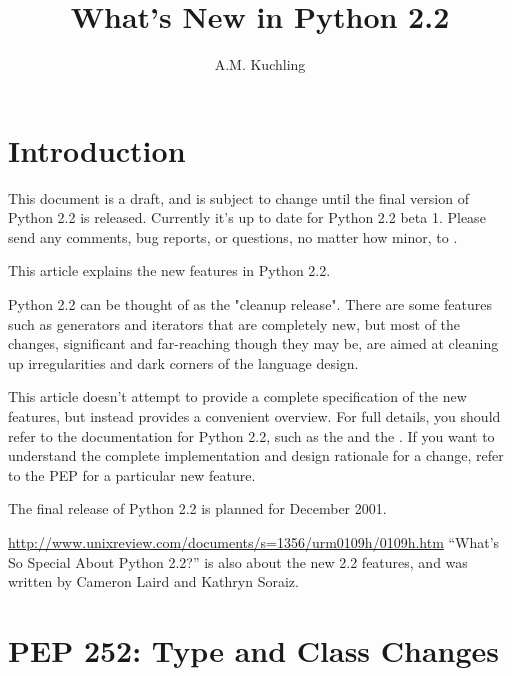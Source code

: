 \documentclass{howto}
\title{What's New in Python 2.2}
\author{A.M. Kuchling}
\begin{document}
\maketitle\tableofcontents

\section{Introduction}

{\large This document is a draft, and is subject to change until the
final version of Python 2.2 is released.  Currently it's up to date
for Python 2.2 beta 1.  Please send any comments, bug reports, or
questions, no matter how minor, to .
}

This article explains the new features in Python 2.2.

Python 2.2 can be thought of as the "cleanup release".  There are some
features such as generators and iterators that are completely new, but
most of the changes, significant and far-reaching though they may be,
are aimed at cleaning up irregularities and dark corners of the
language design.

This article doesn't attempt to provide a complete specification of
the new features, but instead provides a convenient overview.  For
full details, you should refer to the documentation for Python 2.2,
such as the
 and the
.   
If you want to understand the complete implementation and design
rationale for a change, refer to the PEP for a particular new feature.

The final release of Python 2.2 is planned for December 2001.

\begin{seealso}

\url{http://www.unixreview.com/documents/s=1356/urm0109h/0109h.htm}
{``What's So Special About Python 2.2?'' is also about the new 2.2
features, and was written by Cameron Laird and Kathryn Soraiz.}

\end{seealso}


\section{PEP 252: Type and Class Changes}
\end{document}
